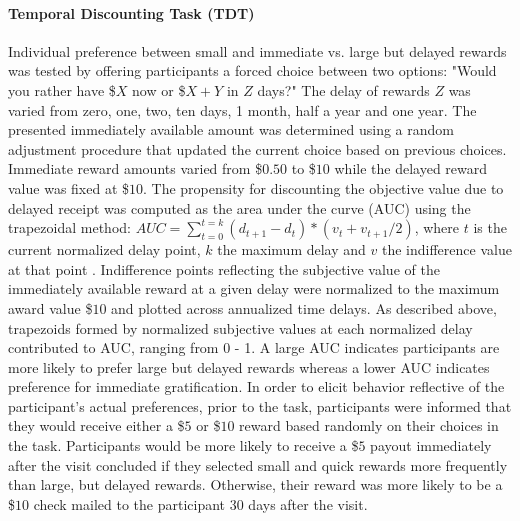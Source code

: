 \documentclass[utf8]{frontiersSCNS} %
\begin{document}
\paragraph{Temporal Discounting Task (TDT)} Individual preference between small and immediate vs. large but delayed rewards was tested by offering participants a forced choice between two options: "Would you rather have \$$X$ now or \$$X+Y$ in $Z$ days?" The delay of rewards $Z$ was varied from zero, one, two, ten days, 1 month, half a year and one year. The presented immediately available amount was determined using a random adjustment procedure that updated the current choice based on previous choices. Immediate reward amounts varied from \$$0.50$ to \$$10$ while the delayed reward value was fixed at \$$10$. The propensity for discounting the objective value due to delayed receipt was computed as the area under the curve (AUC) using the trapezoidal method: $AUC = \sum_{t=0}^{t=k} (d_{t+1}-d_t)*(v_t+v_{t+1} /2)$, where $t$ is the current normalized delay point, $k$ the maximum delay and $v$ the indifference value at that point \citep{Borges2016,olson2007adolescents, myerson2001area}. Indifference points reflecting the subjective value of the immediately available reward at a given delay were normalized to the maximum award value \$$10$ and plotted across annualized time delays. As described above, trapezoids formed by normalized subjective values at each normalized delay contributed to AUC, ranging from 0 - 1.  A large AUC indicates participants are more likely to prefer large but delayed rewards whereas a lower AUC indicates preference for immediate gratification. In order to elicit behavior reflective of the participant's actual preferences, prior to the task, participants were informed that they would receive either a \$$5$ or \$$10$ reward based randomly on their choices in the task. Participants would be more likely to receive a \$$5$ payout immediately after the visit concluded if they selected small and quick rewards more frequently than large, but delayed rewards. Otherwise, their reward was more likely to be a \$$10$ check mailed to the participant 30 days after the visit. 
\end{document}
